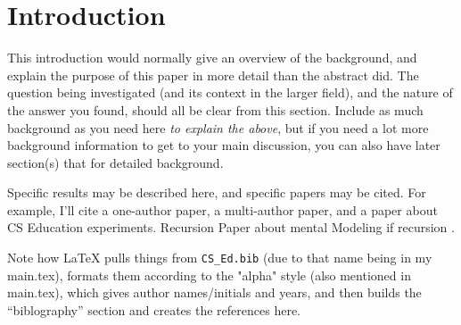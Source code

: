 \section{Introduction}

This introduction would normally give an overview of the background,
and explain the purpose of this paper in more detail than the abstract did.
The question being investigated (and its context in the larger field),
and the nature of the answer you found,
should all be clear from this section.
Include as much background as you need here {\em to explain the above},
but if you need a lot more background information to get to your main discussion,
you can also have later section(s) that for detailed background.


Specific results may be described here, and specific papers may be cited.
For example, I'll cite a one-author paper\cite{DuBoulay:Notional86},
a multi-author paper\cite{TFK:Recursion18},
and a paper about CS Education experiments\cite{FTR:Design11}.
Recursion Paper about mental Modeling if recursion \cite{GSG:Recursion03}.

Note how LaTeX pulls things from {\tt CS\_Ed.bib} (due to that name being in my main.tex), 
formats them according to the "alpha" style (also mentioned in main.tex), which gives author names/initials and years,
and then builds the ``biblography'' section and creates the
references here.
